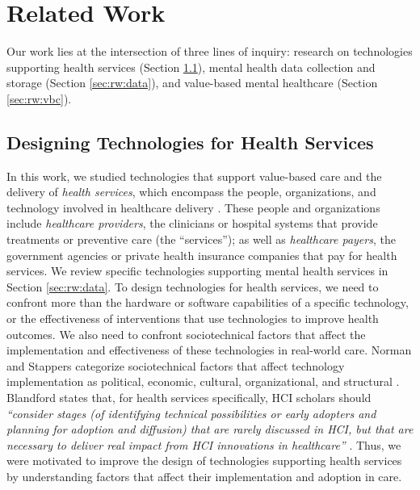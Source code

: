 \section{Related Work}
\label{sec:rw}

Our work lies at the intersection of three lines of inquiry: research on technologies supporting health services (Section \ref{sec:rw:tech-services}), mental health data collection and storage (Section \ref{sec:rw:data}), and value-based mental healthcare (Section \ref{sec:rw:vbc}).

\subsection{Designing Technologies for Health Services}
\label{sec:rw:tech-services}

In this work, we studied technologies that support value-based care and the delivery of \textit{health services}, which encompass the people, organizations, and technology involved in healthcare delivery \cite{issues_working_1994, sanford_schwartz_chapter_2017}.
These people and organizations include \textit{healthcare providers}, the clinicians or hospital systems that provide treatments or preventive care (the ``services''); as well as \textit{healthcare payers}, the government agencies or private health insurance companies that pay for health services.
We review specific technologies supporting mental health services in Section \ref{sec:rw:data}.
To design technologies for health services, we need to confront more than the hardware or software capabilities of a specific technology, or the effectiveness of interventions that use technologies to improve health outcomes.
We also need to confront sociotechnical factors that affect the implementation and effectiveness of these technologies in real-world care. 
Norman and Stappers categorize sociotechnical factors that affect technology implementation as political, economic, cultural, organizational, and structural \cite{norman_designx_2015}.
Blandford states that, for health services specifically, HCI scholars should \textit{``consider stages (of identifying technical possibilities or early adopters and planning for adoption and diffusion) that are rarely discussed in HCI, but that are necessary to deliver real impact from HCI innovations in healthcare''} \cite{blandford_hci_2019}.
Thus, we were motivated to improve the design of technologies supporting health services by understanding factors that affect their implementation and adoption in care.

